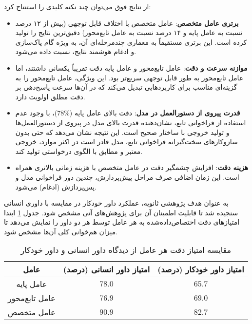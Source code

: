 \noindent
از نتایج فوق می‌توان چند نکته کلیدی را استنتاج کرد:
\begin{itemize}
    \item \textbf{برتری عامل متخصص}: عامل متخصص با اختلاف قابل توجهی (بیش از ۱۲ درصد نسبت به عامل پایه و ۱۴ درصد نسبت به عامل تابع‌محور) دقیق‌ترین نتایج را تولید کرده است. این برتری مستقیماً به معماری چندمرحله‌ای آن، به ویژه گام پاک‌سازی  و ادغام هوشمند نتایج، نسبت داده می‌شود.
    \item \textbf{موازنه سرعت و دقت}: عامل تابع‌محور و عامل پایه دقت تقریباً یکسانی داشتند، اما عامل تابع‌محور به طور قابل توجهی سریع‌تر بود. این ویژگی، عامل تابع‌محور را به گزینه‌ای مناسب برای کاربردهایی تبدیل می‌کند که در آن‌ها سرعت پاسخ‌دهی بر دقت مطلق اولویت دارد.
    \item \textbf{قدرت پیروی از دستورالعمل در مدل}: دقت بالای عامل پایه ($78\%$)، با وجود عدم استفاده از فراخوانی تابع، نشان‌دهنده قدرت بالای مدل  در پیروی از دستورالعمل‌ها و تولید خروجی با ساختار صحیح است. این نتیجه نشان می‌دهد که حتی بدون سازوکارهای سخت‌گیرانه فراخوانی تابع، مدل قادر است در اکثر موارد، خروجی  معتبر و مطابق با الگوی درخواستی تولید کند.
    \item \textbf{هزینه دقت}: افزایش چشمگیر دقت در عامل متخصص با هزینه زمانی بالاتری همراه است. این زمان اضافی صرف مراحل پیش‌پردازش، چندین دور فراخوانی مدل و پس‌پردازش (ادغام) می‌شود.
\end{itemize}

به عنوان هدف پژوهشی ثانویه، عملکرد داور خودکار در مقایسه با داوری انسانی سنجیده شد تا قابلیت اطمینان آن برای پژوهش‌های آتی مشخص شود. جدول \ref{tab:judge_comparison} ابتدا امتیازهای دقت اختصاص‌داده‌شده به هر عامل توسط هر دو داور را نمایش می‌دهد تا میزان هم‌خوانی کلی آن‌ها مشخص شود.

\begin{table}[h!]
\centering
\caption{مقایسه امتیاز دقت هر عامل از دیدگاه داور انسانی و داور خودکار}
\label{tab:judge_comparison}
\begin{tabular}{|c|c|c|}
\hline
\textbf{عامل} & \textbf{امتیاز داور انسانی (درصد)} & \textbf{امتیاز داور خودکار (درصد)} \\
\hline
عامل پایه & $78.0$ & $65.7$ \\
\hline
عامل تابع‌محور & $76.9$ & $69.0$ \\
\hline
عامل متخصص & \textbf{$90.9$} & \textbf{$82.7$} \\
\hline
\end{tabular}
\end{table}

